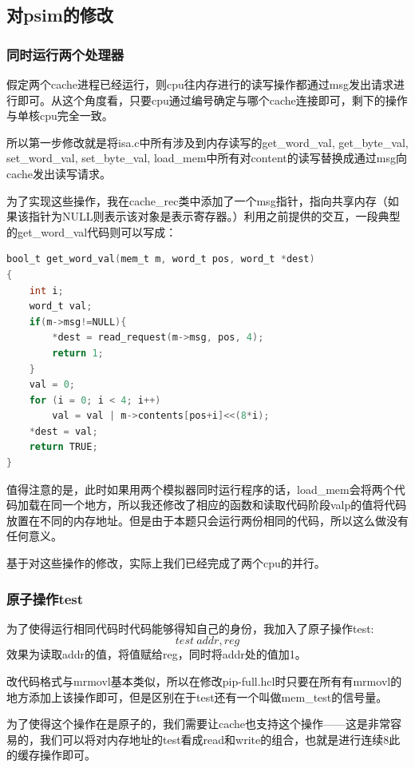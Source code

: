 \documentclass{article}
\theoremstyle{plain} \newtheorem{theorem}{常识}[section]
\theoremstyle{plain} \newtheorem{lizi}{例}[section]
\begin{document}
\subsection{对psim的修改}
\subsubsection{同时运行两个处理器}
假定两个cache进程已经运行，则cpu往内存进行的读写操作都通过msg发出请求进行即可。从这个角度看，只要cpu通过编号确定与哪个cache连接即可，剩下的操作与单核cpu完全一致。

所以第一步修改就是将isa.c中所有涉及到内存读写的get\_word\_val, get\_byte\_val, set\_word\_val, set\_byte\_val, load\_mem中所有对content的读写替换成通过msg向cache发出读写请求。

为了实现这些操作，我在cache\_rec类中添加了一个msg指针，指向共享内存（如果该指针为NULL则表示该对象是表示寄存器。）利用之前提供的交互，一段典型的get\_word\_val代码则可以写成：

\begin{lstlisting}[language=C]
bool_t get_word_val(mem_t m, word_t pos, word_t *dest)
{
    int i;
    word_t val;
    if(m->msg!=NULL){
        *dest = read_request(m->msg, pos, 4);
        return 1;
    }
    val = 0;
    for (i = 0; i < 4; i++)
        val = val | m->contents[pos+i]<<(8*i);
    *dest = val;
    return TRUE;
}
\end{lstlisting}

值得注意的是，此时如果用两个模拟器同时运行程序的话，load\_mem会将两个代码加载在同一个地方，所以我还修改了相应的函数和读取代码阶段valp的值将代码放置在不同的内存地址。但是由于本题只会运行两份相同的代码，所以这么做没有任何意义。

基于对这些操作的修改，实际上我们已经完成了两个cpu的并行。

\subsubsection{原子操作test}
为了使得运行相同代码时代码能够得知自己的身份，我加入了原子操作test:
$$test\ addr,reg$$
效果为读取addr的值，将值赋给reg，同时将addr处的值加1。

改代码格式与mrmovl基本类似，所以在修改pip-full.hcl时只要在所有有mrmovl的地方添加上该操作即可，但是区别在于test还有一个叫做mem\_test的信号量。

为了使得这个操作在是原子的，我们需要让cache也支持这个操作——这是非常容易的，我们可以将对内存地址的test看成read和write的组合，也就是进行连续8此的缓存操作即可。
\end{document}
